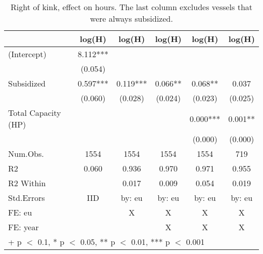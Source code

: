 \begin{table}

\caption{\label{tab:}Right of kink, effect on hours. The last column excludes vessels that were always subsidized.}
\centering
\begin{tabular}[t]{lccccc}
\toprule
  & log(H) & log(H)  & log(H)   & log(H)    & log(H)    \\
\midrule
(Intercept) & \num{8.112}*** &  &  &  & \\
 & (\num{0.054}) &  &  &  & \\
Subsidized & \num{0.597}*** & \num{0.119}*** & \num{0.066}** & \num{0.068}** & \num{0.037}\\
 & (\num{0.060}) & (\num{0.028}) & (\num{0.024}) & (\num{0.023}) & (\num{0.025})\\
Total Capacity (HP) &  &  &  & \num{0.000}*** & \num{0.001}**\\
 &  &  &  & (\num{0.000}) & (\num{0.000})\\
\midrule
Num.Obs. & \num{1554} & \num{1554} & \num{1554} & \num{1554} & \num{719}\\
R2 & \num{0.060} & \num{0.936} & \num{0.970} & \num{0.971} & \num{0.955}\\
R2 Within &  & \num{0.017} & \num{0.009} & \num{0.054} & \num{0.019}\\
Std.Errors & IID & by: eu & by: eu & by: eu & by: eu\\
FE: eu &  & X & X & X & X\\
FE: year &  &  & X & X & X\\
\bottomrule
\multicolumn{6}{l}{\rule{0pt}{1em}+ p $<$ 0.1, * p $<$ 0.05, ** p $<$ 0.01, *** p $<$ 0.001}\\
\end{tabular}
\end{table}
